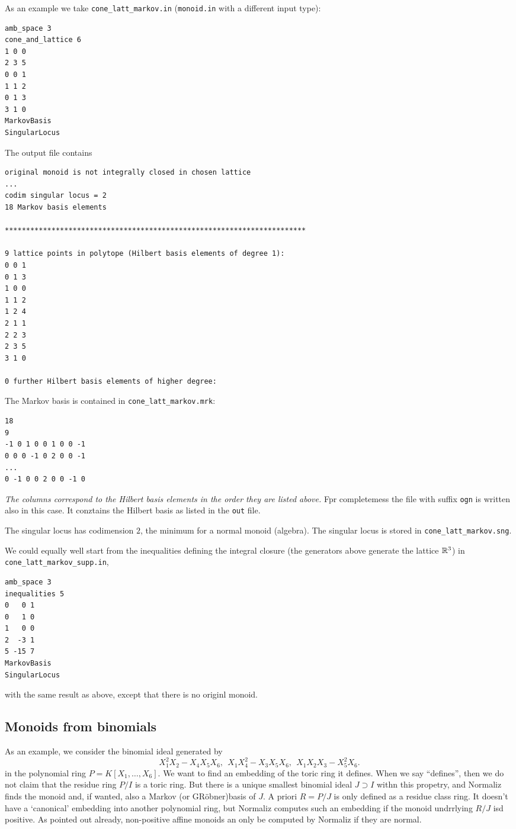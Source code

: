 As an example we take \verb|cone_latt_markov.in| (\verb|monoid.in| with a different input type):
\begin{Verbatim}
amb_space 3
cone_and_lattice 6
1 0 0
2 3 5
0 0 1
1 1 2
0 1 3
3 1 0
MarkovBasis
SingularLocus
\end{Verbatim}

The output file contains
\begin{Verbatim}
original monoid is not integrally closed in chosen lattice
...
codim singular locus = 2
18 Markov basis elements

***********************************************************************

9 lattice points in polytope (Hilbert basis elements of degree 1):
0 0 1
0 1 3
1 0 0
1 1 2
1 2 4
2 1 1
2 2 3
2 3 5
3 1 0

0 further Hilbert basis elements of higher degree:
\end{Verbatim}
The Markov basis is contained in \verb|cone_latt_markov.mrk|:
\begin{Verbatim}
18
9
-1 0 1 0 0 1 0 0 -1 
0 0 0 -1 0 2 0 0 -1 
...
0 -1 0 0 2 0 0 -1 0 
\end{Verbatim}
\emph{The columns correspond to the Hilbert basis elements in the order they are listed above.} Fpr completemess the file with suffix \verb|ogn| is written also in this case. It conztains the Hilbert basis as listed in the \verb|out| file.

The singular locus has codimension $2$, the minimum for a normal monoid (algebra). The singular locus is stored in \verb|cone_latt_markov.sng|.

We could equally well start from the inequalities defining the integral closure (the generators above generate the lattice ${\mathbb R}^3$) in \verb|cone_latt_markov_supp.in|,
\begin{Verbatim}
amb_space 3
inequalities 5
0   0 1
0   1 0
1   0 0
2  -3 1
5 -15 7
MarkovBasis
SingularLocus
\end{Verbatim}
with the same result as above, except that there is no originl monoid.

\subsection{Monoids from binomials}\label{binom_ex}

As an example, we consider the binomial ideal generated by
$$
X_1^2X_2-X_4X_5X_6,\ \ X_1X_4^2-X_3X_5X_6,\ \ X_1X_2X_3-X_5^2X_6.
$$
in the polynomial ring $P=K[X_1,\dots, X_6]$. We want to find an embedding of the toric ring it defines. When we say ``defines'', then we do not claim that the residue ring  $P/I$ is a toric ring. But there is a unique smallest binomial ideal $J\supset I$ withn this propetry, and Normaliz finds the monoid and, if wanted, also a Markov (or GRöbner)basis of $J$. A priori $R=P/J$ is only defined as a residue class ring. It doesn't have a `canonical' embedding into another polynomial ring, but Normaliz computes such an embedding if the monoid undrrlying $R/J$ isd positive. As pointed out already, non-positive affine monoids an only be computed by Normaliz if they are normal.

